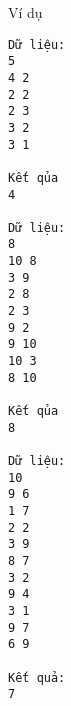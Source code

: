 Ví dụ
\begin{verbatim}
Dữ liệu:
5
4 2
2 2
2 3
3 2
3 1

Kết qủa
4

Dữ liệu:
8
10 8
3 9
2 8
2 3
9 2
9 10
10 3
8 10

Kết qủa
8

Dữ liệu:
10
9 6
1 7
2 2
3 9
8 7
3 2
9 4
3 1
9 7
6 9

Kết quả:
7
\end{verbatim}